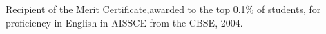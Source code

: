 \documentclass[10pt]{article}
\renewcommand{\section}[2]%
        {\pagebreak[2]\vspace{1.3\baselineskip}%
         \phantomsection\addcontentsline{toc}{section}{#1}%
         \hspace{0in}%
         \marginpar{
         \raggedright \scshape #1}#2}
\newcommand{\spc}{\vspace{1.2mm}}
\begin{document}
\spc

{Recipient of the Merit Certificate,awarded to the top 0.1\% of students, for proficiency in English in AISSCE from the CBSE, 2004.}


\end{document}
